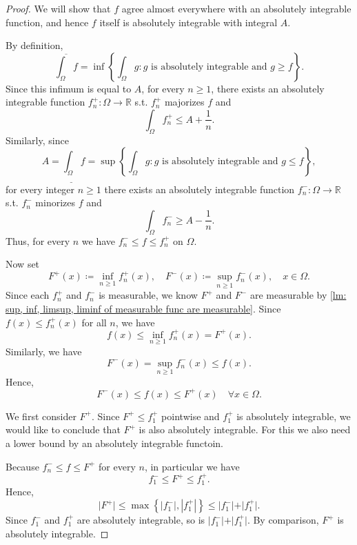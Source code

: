 \begin{proof}
    We will show that \(f\) agree almost everywhere with an absolutely integrable function, and hence \(f\) itself is absolutely integrable with integral \(A\). 

    By definition,
    \[
        \overline{\int _\Omega f} = \inf \left\{ \int _\Omega g: g \text{ is absolutely integrable and } g \ge f  \right\}.  
    \]   
    Since this infimum is equal to \(A\), for every \(n \ge 1\), there exists an absolutely integrable function \(f_n^+: \Omega \to \mathbb{R}\) s.t. \(f_n^+\) majorizes \(f\) and
    \[
        \int _\Omega f_n^+ \le A + \frac{1}{n}.
    \]     
    Similarly, since 
    \[
        A = \underline{\int _\Omega } f = \sup \left\{ \int _\Omega g: g \text{ is absolutely integrable and } g \le f \right\},  
    \]
    for every integer \(n \ge 1\) there exists an absolutely integrable function \(f_n^-: \Omega \to \mathbb{R}\) s.t. \(f_n^-\) minorizes \(f\) and 
    \[
        \int _\Omega f_n^- \ge A - \frac{1}{n}.
    \]   
    Thus, for every \(n\) we have \(f_n^- \le f \le f_n^+\) on \(\Omega\).

    Now set 
    \[
        F^+(x) \coloneqq \inf _{n \ge 1} f_n^+ (x), \quad F^-(x) \coloneqq \sup _{n \ge 1} f_n^-(x), \quad x \in \Omega.
    \]   
    Since each \(f_n^+\) and \(f_n^-\) is measurable, we know \(F^+\) and \(F^-\) are measurable by \autoref{lm: sup, inf, limsup, liminf of measurable func are measurable}. Since \(f(x) \le f_n^+(x)\) for all \(n\), we have 
    \[
        f(x) \le \inf _{n \ge 1} f_n^+(x) = F^+(x).
    \]       
    Similarly, we have 
    \[
        F^-(x) = \sup _{n \ge 1} f_n^-(x) \le f(x).
    \]
    Hence, 
    \[
        F^-(x) \le f(x) \le F^+(x) \quad \forall x \in \Omega.
    \]

    We first consider \(F^+\). Since \(F^+ \le f_1^+\) pointwise and \(f_1^+\) is absolutely integrable, we would like to conclude that \(F^+\) is also absolutely integrable. For this we also need a lower bound by an absolutely integrable functoin. 

    Because \(f_n^- \le f \le F^+\) for every \(n\), in particular we have 
    \[
        f_1^- \le F^+ \le f_1^+.
    \]      
    Hence,
    \[
        \vert F^+ \vert \le \max \left\{ \left\vert f_1^- \right\vert, \left\vert f_1^+ \right\vert   \right\} \le \vert f_1^- \vert + \vert f_1^+ \vert.   
    \]
    Since \(f_1^-\) and \(f_1^+\) are absolutely integrable, so is \(\vert f_1^- \vert + \vert f_1^+ \vert  \). By comparison, \(F^+\) is absolutely integrable. 


\end{proof}

